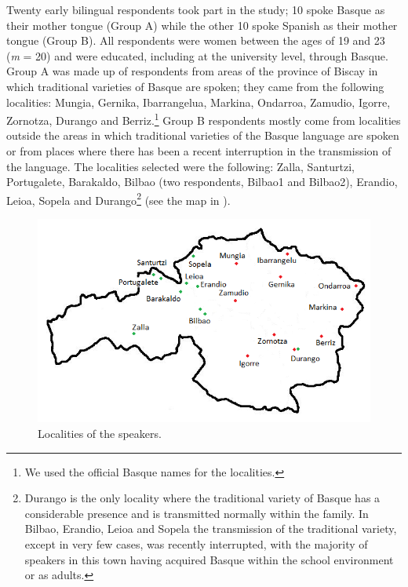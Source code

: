 \documentclass[output=paper]{langsci/langscibook}
\begin{document}
  Twenty early bilingual respondents took part in the study; 10 spoke Basque as their mother tongue (Group A) while the other 10 spoke Spanish as their mother tongue (Group B). All respondents were women between the ages of 19 and 23 (\textit{m} = 20) and were educated, including at the university level, through Basque. Group A was made up of respondents from areas of the province of Biscay in which traditional varieties of Basque are spoken; they came from the following localities: Mungia, Gernika, Ibarrangelua, Markina, Ondarroa, Zamudio, Igorre, Zornotza, Durango and Berriz.\footnote{We used the official Basque names for the localities.} Group B respondents mostly come from localities outside the areas in which traditional varieties of the Basque language are spoken or from places where there has been a recent interruption in the transmission of the language. The localities selected were the following: Zalla, Santurtzi, Portugalete, Barakaldo, Bilbao (two respondents, Bilbao1 and Bilbao2), Erandio, Leioa, Sopela and Durango\footnote{Durango is the only locality where the traditional variety of Basque has a considerable presence and is transmitted normally within the family. In Bilbao, Erandio, Leioa and Sopela the transmission of the traditional variety, except in very few cases, was recently interrupted, with the majority of speakers in this town having acquired Basque within the school environment or as adults.} (see the map in ). 
  
 \begin{figure}
\includegraphics[scale=0.75]{figures/GAM-img5.png}
\caption{Localities of the speakers.}
\label{fig:gam:2}
\end{figure} 
\end{document}
